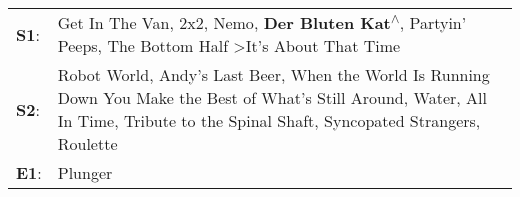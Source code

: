 \begin{supertabular}{p{0.03\textwidth}p{0.92\textwidth}}
 \textbf{S1}:  &                                                                                       Get In The Van\textsuperscript{}, \enspace 2x2\textsuperscript{}, \enspace Nemo\textsuperscript{}, \enspace \textbf{Der Bluten Kat\textsuperscript{$\wedge$}}, \enspace Partyin' Peeps\textsuperscript{}, \enspace The Bottom Half\textsuperscript{} \textgreater \enspace It's About That Time\textsuperscript{}  \enspace  \\
 \textbf{S2}:  &  Robot World\textsuperscript{}, \enspace Andy's Last Beer\textsuperscript{}, \enspace When the World Is Running Down You Make the Best of What's Still Around\textsuperscript{}, \enspace Water\textsuperscript{}, \enspace All In Time\textsuperscript{}, \enspace Tribute to the Spinal Shaft\textsuperscript{}, \enspace Syncopated Strangers\textsuperscript{}, \enspace Roulette\textsuperscript{}  \enspace  \\
 \textbf{E1}:  &                                                                                                                                                                                                                                                                                                                                                                               Plunger\textsuperscript{}  \enspace  \\
\end{supertabular}
